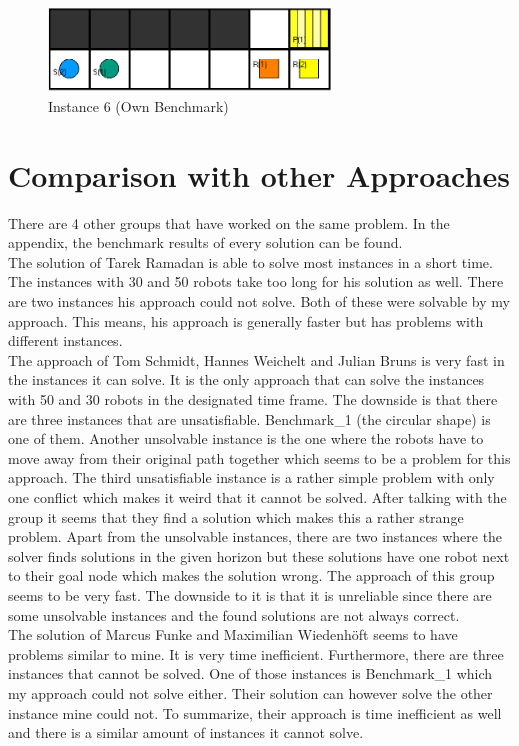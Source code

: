 \documentclass[runningheads]{llncs}
\begin{document}
\begin{figure}[h]
\includegraphics[width=75mm]{Images/Instance 3}
\caption{Instance 6 (Own Benchmark)}
\label{fig:I3}
\end{figure}


\section{Comparison with other Approaches}
There are 4 other groups that have worked on the same problem. In the appendix, the benchmark results of every solution can be found. \\
The solution of Tarek Ramadan \cite{github1} is able to solve most instances in a short time. The instances with 30 and 50 robots take too long for his solution as well. There are two instances his approach could not solve. Both of these were solvable by my approach. This means, his approach is generally faster but has problems with different instances. \\
The approach of Tom Schmidt, Hannes Weichelt and Julian Bruns \cite{github2} is very fast in the instances it can solve. It is the only approach that can solve the instances with 50 and 30 robots in the designated time frame. The downside is that there are three instances that are unsatisfiable. Benchmark\_1 (the circular shape) is one of them. Another unsolvable instance is the one where the robots have to move away from their original path together which seems to be a problem for this approach. The third unsatisfiable instance is a rather simple problem with only one conflict which makes it weird that it cannot be solved. After talking with the group it seems that they find a solution which makes this a rather strange problem. Apart from the unsolvable instances, there are two instances where the solver finds solutions in the given horizon but these solutions have one robot next to their goal node which makes the solution wrong.  The approach of this group seems to be very fast. The downside to it is that it is unreliable since there are some unsolvable instances and the found solutions are not always correct.  \\
The solution of Marcus Funke and Maximilian Wiedenhöft \cite{github3} seems to have problems similar to mine. It is very time inefficient. Furthermore, there are three instances that cannot be solved. One of those instances is Benchmark\_1 which my approach could not solve either. Their solution can however solve the other instance mine could not. To summarize, their approach is time inefficient as well and there is a similar amount of instances it cannot solve. \\
\end{document}
